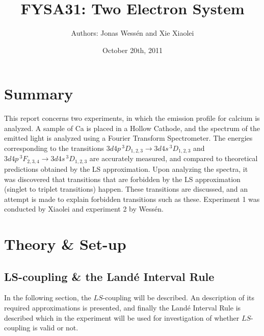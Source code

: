 \documentclass[a4paper]{article}
\title{\textbf{FYSA31:} Two Electron System}
\author{Authors: Jonas Wess\'en and Xie Xiaolei}
\date{October 20th, 2011}
\begin{document}
 
  
\maketitle    
\thispagestyle{empty} 
 
\newpage
\tableofcontents
\newpage

\section{Summary}
 
This report concerns two experiments, in which the emission profile for calcium is analyzed. A sample of Ca is placed in a Hollow Cathode, and the spectrum of the emitted light is analyzed using a Fourier Transform Spectrometer. The energies corresponding to the transitions $3d4p\,^3D_{1,2,3} \to 3d4s\,^3D_{1,2,3}$ and $3d4p\,^3F_{2,3,4} \to 3d4s\,^3D_{1,2,3}$ are accurately measured, and compared to theoretical predictions obtained by the LS approximation. Upon analyzing the spectra, it was discovered that transitions that are forbidden by the LS approximation (singlet to triplet transitions) happen. These transitions are discussed, and an attempt is made to explain forbidden transitions such as these. Experiment 1 was conducted by Xiaolei and experiment 2 by Wess\'en.  
 
\section{Theory \& Set-up}
 
\subsection{LS-coupling \& the Land\'e Interval Rule}

In the following section, the $LS$-coupling will be described. An description of its required approximations is presented, and finally the Land\'e Interval Rule is described which in the experiment will be used for investigation of whether $LS$-coupling is valid or not. 
\end{document}
